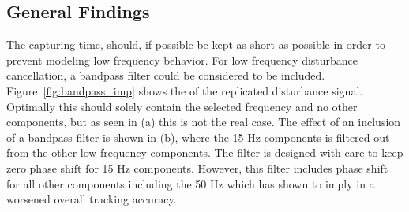 \FloatBarrier
\subsection{General Findings}\label{subsec:longterm}
The capturing time, should, if possible be kept as short as possible in order to prevent modeling low frequency behavior. For low frequency disturbance cancellation, a bandpass filter could be considered to be included. Figure~\ref{fig:bandpass_imp} shows the \abbrFFT of the replicated disturbance signal. Optimally this should solely contain the selected frequency and no other components, but as seen in (a) this is not the real case. The effect of an inclusion of a bandpass filter is shown in (b), where the 15 Hz components is filtered out from the other low frequency components. The filter is designed with care to keep zero phase shift for 15 Hz components. However, this filter includes phase shift for all other components including the 50 Hz which has shown to imply in a worsened overall tracking accuracy.

